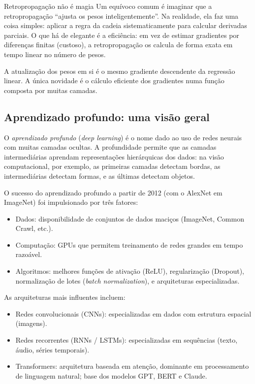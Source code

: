 \documentclass[12pt,a4paper]{article}
\begin{document}
\begin{notabox}{Retropropagação não é magia}
Um equívoco comum é imaginar que a retropropagação ``ajusta os pesos inteligentemente''. Na realidade, ela faz uma coisa simples: aplicar a regra da cadeia sistematicamente para calcular derivadas parciais. O que há de elegante é a eficiência: em vez de estimar gradientes por diferenças finitas (custoso), a retropropagação os calcula de forma exata em tempo linear no número de pesos.

A atualização dos pesos em si é o mesmo gradiente descendente da regressão linear. A única novidade é o cálculo eficiente dos gradientes numa função composta por muitas camadas.
\end{notabox}

\subsection{Aprendizado profundo: uma visão geral}
\label{subsec:deep-learning}

O \emph{aprendizado profundo} (\textit{deep learning}) é o nome dado ao uso de redes neurais com muitas camadas ocultas. A profundidade permite que as camadas intermediárias aprendam representações hierárquicas dos dados: na visão computacional, por exemplo, as primeiras camadas detectam bordas, as intermediárias detectam formas, e as últimas detectam objetos.

O sucesso do aprendizado profundo a partir de 2012 (com o AlexNet em ImageNet) foi impulsionado por três fatores:

\begin{itemize}
    \item Dados: disponibilidade de conjuntos de dados maciços (ImageNet, Common Crawl, etc.).
    \item Computação: GPUs que permitem treinamento de redes grandes em tempo razoável.
    \item Algoritmos: melhores funções de ativação (ReLU), regularização (Dropout), normalização de lotes (\textit{batch normalization}), e arquiteturas especializadas.
\end{itemize}

As arquiteturas mais influentes incluem:

\begin{itemize}
    \item Redes convolucionais (CNNs): especializadas em dados com estrutura espacial (imagens).
    \item Redes recorrentes (RNNs / LSTMs): especializadas em sequências (texto, áudio, séries temporais).
    \item Transformers: arquitetura baseada em atenção, dominante em processamento de linguagem natural; base dos modelos GPT, BERT e Claude.
\end{itemize}
\end{document}
